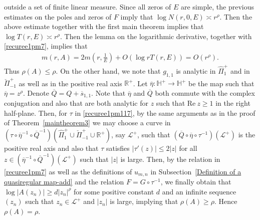 \documentclass[12pt]{amsart}
\numberwithin{equation}{section}
\begin{document}
outside a set of finite linear measure. Since all zeros of $E$ are simple, the previous estimates on the poles and zeros of $F$ imply that $\log N(r,0,E)\asymp r^{\rho}$. Then the above estimate together with the first main theorem implies that $\log T(r,E)\asymp r^{\rho}$. Then the lemma on the logarithmic derivative, together with \eqref{recuree1pm7}, implies that
\begin{equation*}
\begin{split}
m(r,A)=2m\left(r,\frac{1}{E}\right)+O(\log rT(r,E))=O(r^{\rho}).
\end{split}
\end{equation*}
Thus $\rho(A)\leq \rho$. On the other hand, we note that $g_{1,1}$ is analytic in $\hat{\Pi}_1^{+}$ and in $\check{\Pi}_{-1}^{+}$ as well as in the positive real axis $\mathbb{R}^{+}$. Let $\overline{\eta}:\mathbb{H}^{+}\to \mathbb{H}^{+}$ be the map such that $\overline{\eta}=z^{\rho}$. Denote $\overline{Q}=Q+\overline{s}_{1,1}$. Note that $\overline{\eta}$ and $\overline{Q}$ both commute with the complex conjugation and also that are both analytic for $z$ such that $\text{Re}\ z\geq 1$ in the right half-plane. Then, for $\tau$ in \eqref{recuree1pm117}, by the same arguments as in the proof of Theorem~\ref{maintheorem3} we may choose a curve in $(\tau\circ \overline{\eta}^{-1}\circ \overline{Q}^{-1})(\hat{\Pi}_1^{+}\cup\check{\Pi}_{-1}^{+}\cup \mathbb{R}^{+})$, say $\mathcal{L}^{+}$, such that $(\overline{Q}\circ\overline{\eta}\circ\tau^{-1})(\mathcal{L}^{+})$ is the positive real axis and also that $\tau$ satisfies $|\tau'(z)|\leq 2|z|$ for all $z\in (\overline{\eta}^{-1}\circ \overline{Q}^{-1})(\mathcal{L}^{+})$ such that $|z|$ is large. Then, by the relation in \eqref{recuree1pm7} as well as the definitions of $u_{m,n}$ in Subsection~\ref{Definition of a quasiregular map-add} and the relation $F=G\circ \tau^{-1}$, we finally obtain that $\log |A(z_n)|\geq d|z_n|^{\rho}$ for some positive constant $d$ and an infinite sequence $(z_n)$ such that $z_n\in\mathcal{L}^{+}$ and $|z_n|$ is large, implying that $\rho(A)\geq \rho$. Hence $\rho(A)=\rho$.
\end{document}

